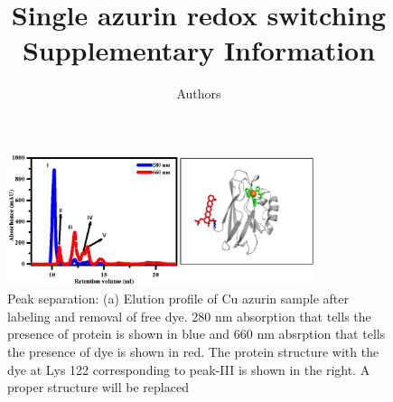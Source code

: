 \documentclass[11pt,a4paper,onecolumn]{article}
\newcommand*{\affaddr}[1]{#1} %
\newcommand*{\email}[1]{\texttt{#1}} %
\begin{document}
\author{Authors
}

\date{\vspace{1ex}} %

\title{\textbf{Single azurin redox switching}\\ \vspace{3ex} Supplementary Information{} \vspace{3ex}}

\maketitle
\tableofcontents
\pagebreak
\begin{figure}
  \centering
  \includegraphics[width=0.8\textwidth]{peak_separation.eps}
  \makeatletter
  \renewcommand{\fnum@figure}{\figurename~S\thefigure}
  \makeatother
  \caption{Peak separation: (a) Elution profile of Cu azurin sample after labeling and removal of free dye. 280 nm absorption that tells the presence of protein is shown in blue and 660 nm absrption that tells the presence of dye is shown in red. The protein structure with the dye at Lys 122 corresponding to peak-III is shown in the right. {A proper structure will be replaced}}
  \label{SIfig: peak_sep}
\end{figure}
\end{document}
